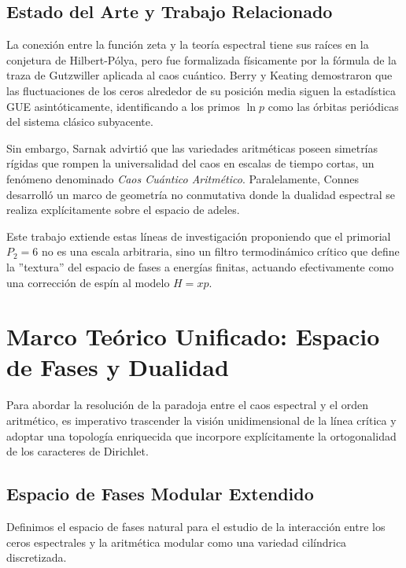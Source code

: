 \documentclass[12pt, a4paper]{article}
\theoremstyle{plain}
\theoremstyle{definition}
\begin{document}
\subsection{Estado del Arte y Trabajo Relacionado}

La conexión entre la función zeta y la teoría espectral tiene sus raíces en la conjetura de Hilbert-Pólya, pero fue formalizada físicamente por la fórmula de la traza de Gutzwiller aplicada al caos cuántico. Berry y Keating \cite{berry1999} demostraron que las fluctuaciones de los ceros alrededor de su posición media siguen la estadística GUE asintóticamente, identificando a los primos $\ln p$ como las órbitas periódicas del sistema clásico subyacente.

Sin embargo, Sarnak \cite{sarnak1999} advirtió que las variedades aritméticas poseen simetrías rígidas que rompen la universalidad del caos en escalas de tiempo cortas, un fenómeno denominado \emph{Caos Cuántico Aritmético}. Paralelamente, Connes \cite{connes1999} desarrolló un marco de geometría no conmutativa donde la dualidad espectral se realiza explícitamente sobre el espacio de adeles.

Este trabajo extiende estas líneas de investigación proponiendo que el primorial $P_2=6$ no es una escala arbitraria, sino un filtro termodinámico crítico que define la ''textura'' del espacio de fases a energías finitas, actuando efectivamente como una corrección de espín al modelo $H=xp$.

\section{Marco Teórico Unificado: Espacio de Fases y Dualidad}

Para abordar la resolución de la paradoja entre el caos espectral y el orden aritmético, es imperativo trascender la visión unidimensional de la línea crítica y adoptar una topología enriquecida que incorpore explícitamente la ortogonalidad de los caracteres de Dirichlet.

\subsection{Espacio de Fases Modular Extendido}

Definimos el espacio de fases natural para el estudio de la interacción entre los ceros espectrales y la aritmética modular como una variedad cilíndrica discretizada.
\end{document}
